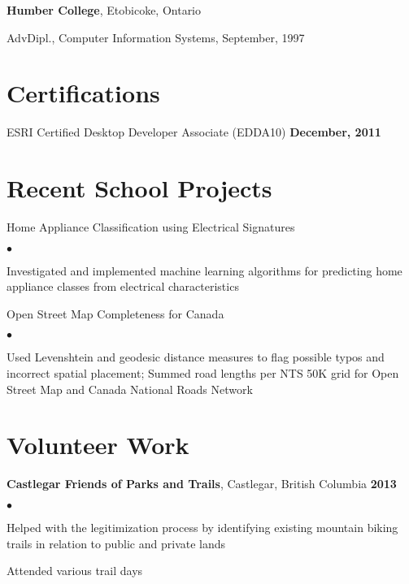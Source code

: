 \documentclass[11pt,margin,line]{res}
\newenvironment{list1}{
  \begin{list}{\ding{113}}{%
      \setlength{\itemsep}{0in}
      \setlength{\parsep}{0in} \setlength{\parskip}{0in}
      \setlength{\topsep}{0in} \setlength{\partopsep}{0in} 
      \setlength{\leftmargin}{0in}}}{\end{list}}
\newenvironment{list2}{
  \begin{list}{$\bullet$}{%
      \setlength{\itemsep}{0in}
      \setlength{\parsep}{0in} \setlength{\parskip}{0in}
      \setlength{\topsep}{0in} \setlength{\partopsep}{0in} 
      \setlength{\leftmargin}{0.25in}}}{\end{list}}
\begin{document}
\begin{resume}
{\bf Humber College}, Etobicoke, Ontario\\
\vspace*{-.15in}
\begin{list1}
\item[] AdvDipl., Computer Information Systems, September, 1997
\end{list1}

\section{\sc Certifications}
ESRI Certified Desktop Developer Associate (EDDA10) \hfill {\bf December, 2011}

\section{\sc Recent School Projects}
{\prj Home Appliance Classification using Electrical Signatures}
\begin{list2}
\item Investigated and implemented machine learning algorithms for predicting home appliance classes from electrical characteristics
\end{list2}

{\prj Open Street Map Completeness for Canada}
\begin{list2}
\item Used Levenshtein and geodesic distance measures to flag possible typos and incorrect spatial placement; Summed road lengths per NTS 50K grid for Open Street Map and Canada National Roads Network 
\end{list2}

\section{\sc Volunteer Work}
{\bf Castlegar Friends of Parks and Trails}, Castlegar, British Columbia \hfill {\bf 2013}\\

\vspace{-.4cm}
\begin{list2}
\item Helped with the legitimization process by identifying existing mountain biking trails in relation to public and private lands
\item Attended various trail days
\end{list2}

\end{resume}
\end{document}
